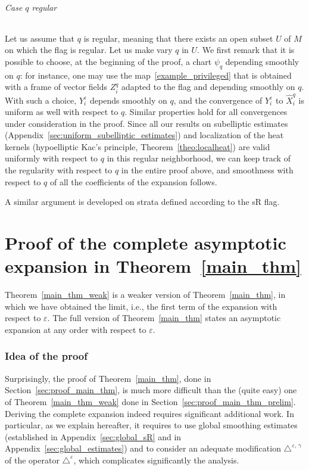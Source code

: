 \documentclass[AHL,Unicode,published]{cedram}
\begin{document}
\paragraph{Case $q$ regular}
Let us assume that $q$ is regular, meaning that there exists an open subset $U$ of $M$ on which the flag is regular. Let us make vary $q$ in $U$. We first remark that it is possible to choose, at the beginning of the proof, a chart $\psi_{q}$ depending smoothly on $q$: for instance, one may use the map~\eqref{example_privileged} that is obtained with a frame of vector fields $Z_i^{q}$ adapted to the flag and depending smoothly on $q$. With such a choice, $Y_i^\varepsilon$ depends smoothly on $q$, and the convergence of $Y_i^\varepsilon$ to $\widehat{X}_i^{q}$ is uniform as well with respect to $q$. Similar properties hold for all convergences under consideration in the proof. Since all our results on subelliptic estimates (Appendix~\ref{sec:uniform_subelliptic_estimates}) and localization of the heat kernels (hypoelliptic Kac's principle, Theorem~\ref{theo:localheat}) are valid uniformly with respect to $q$ in this regular neighborhood, we can keep track of the regularity with respect to $q$ in the entire proof above, and smoothness with respect to $q$ of all the coefficients of the expansion follows.

A similar argument is developed on strata defined according to the sR flag.

\vspace{10em}
\pagebreak

{\Large
\part{Proof of the complete asymptotic expansion in Theorem~\ref{main_thm}}\label{part_complete}
}


Theorem~\ref{main_thm_weak} is a weaker version of Theorem~\ref{main_thm}, in which we have obtained the limit, i.e., the first term of the expansion with respect to $\varepsilon$. The full version of Theorem~\ref{main_thm} states an asymptotic expansion at any order with respect to $\varepsilon$.

\goodbreak
\section{Idea of the proof}\label{sec_ideaoftheproof}
Surprisingly, the proof of Theorem~\ref{main_thm}, done in Section~\ref{sec:proof_main_thm}, is much more difficult than the (quite easy) one of Theorem~\ref{main_thm_weak} done in Section~\ref{sec:proof_main_thm_prelim}. Deriving the complete expansion indeed requires significant additional work. In particular, as we explain hereafter, it requires to use global smoothing estimates (established in Appendix~\ref{sec:global_sR} and in Appendix~\ref{sec:global_estimates}) and to consider an adequate modification $\triangle^{\varepsilon,\,\gamma}$ of the operator $\triangle^\varepsilon$, which complicates significantly the analysis.
\end{document}
